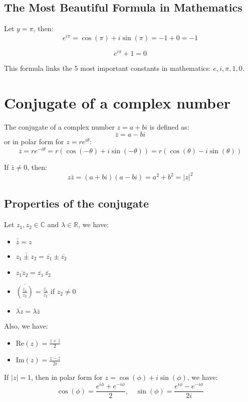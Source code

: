 \subsection{The Most Beautiful Formula in Mathematics}
Let $y = \pi$, then:
\[e^{i\pi} = \cos(\pi) + i \sin(\pi) = -1 + 0 = -1\]
\begin{theorem}
    \[e^{i\pi} + 1 = 0
    \]
\end{theorem}
This formula links the 5 most important constants in mathematics: $e, i, \pi, 1, 0$.

\section{Conjugate of a complex number}
\begin{definition}
    The conjugate of a complex number $z = a + bi$ is defined as:
    \[
        \overline{z} = a - bi
    \]
    or in polar form for $z = r e^{i \theta}$:
    \[
        \overline{z} = r e^{-i \theta} = r(\cos(-\theta) + i \sin(-\theta)) = r(\cos(\theta) - i \sin(\theta))
    \]
\end{definition}
If $\bar{z} \neq 0$, then:
\[
    z \bar{z} = (a + bi)(a - bi) = a^2 + b^2 = |z|^2
\]

\subsection{Properties of the conjugate}
Let $z_1, z_2 \in \mathbb{C}$ and $\lambda \in \mathbb{R}$, we have:
\begin{itemize}[itemsep=1pt,label=$\circ$]
    \item $\overline{\overline{z}} = z$
    \item $\overline{z_1 \pm z_2} = \overline{z_1} \pm \overline{z_2}$
    \item $\overline{z_1 z_2} = \overline{z_1} \, \overline{z_2}$
    \item $\overline{\left(\frac{z_1}{z_2}\right)} = \frac{\overline{z_1}}{\overline{z_2}}$ if $z_2 \neq 0$
    \item $\overline{\lambda z} = \lambda \overline{z}$
\end{itemize}
Also, we have:
\begin{itemize}[itemsep=1pt,label=$\circ$]
    \item $\text{Re}(z) = \frac{z + \overline{z}}{2}$
    \item $\text{Im}(z) = \frac{z - \overline{z}}{2i}$
\end{itemize}
If $|z| = 1$, then in polar form for $z = \cos(\phi) + i \sin(\phi)$, we have:
\[
    \cos(\phi) = \frac{e^{i\phi} + e^{-i\phi}}{2}, \quad \sin(\phi) = \frac{e^{i\phi} - e^{-i\phi}}{2i}
\]

